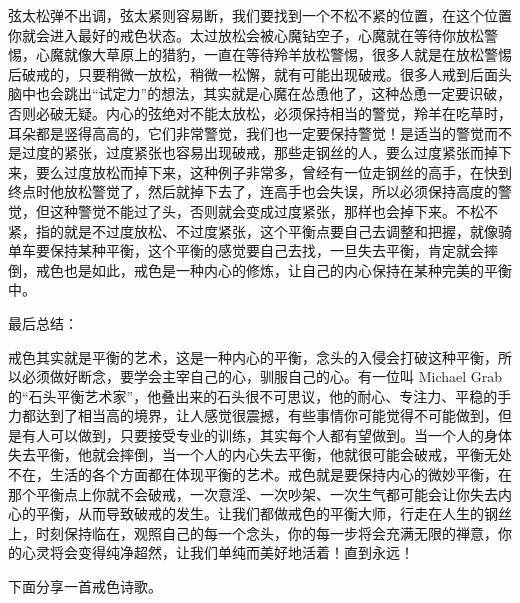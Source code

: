 弦太松弹不出调，弦太紧则容易断，我们要找到一个不松不紧的位置，在这个位置你就会进入最好的戒色状态。太过放松会被心魔钻空子，心魔就在等待你放松警惕，心魔就像大草原上的猎豹，一直在等待羚羊放松警惕，很多人就是在放松警惕后破戒的，只要稍微一放松，稍微一松懈，就有可能出现破戒。很多人戒到后面头脑中也会跳出“试定力”的想法，其实就是心魔在怂恿他了，这种怂恿一定要识破，否则必破无疑。内心的弦绝对不能太放松，必须保持相当的警觉，羚羊在吃草时，耳朵都是竖得高高的，它们非常警觉，我们也一定要保持警觉！是适当的警觉而不是过度的紧张，过度紧张也容易出现破戒，那些走钢丝的人，要么过度紧张而掉下来，要么过度放松而掉下来，这种例子非常多，曾经有一位走钢丝的高手，在快到终点时他放松警觉了，然后就掉下去了，连高手也会失误，所以必须保持高度的警觉，但这种警觉不能过了头，否则就会变成过度紧张，那样也会掉下来。不松不紧，指的就是不过度放松、不过度紧张，这个平衡点要自己去调整和把握，就像骑单车要保持某种平衡，这个平衡的感觉要自己去找，一旦失去平衡，肯定就会摔倒，戒色也是如此，戒色是一种内心的修炼，让自己的内心保持在某种完美的平衡中。

最后总结：

戒色其实就是平衡的艺术，这是一种内心的平衡，念头的入侵会打破这种平衡，所以必须做好断念，要学会主宰自己的心，驯服自己的心。有一位叫 Michael Grab 的“石头平衡艺术家”，他叠出来的石头很不可思议，他的耐心、专注力、平稳的手力都达到了相当高的境界，让人感觉很震撼，有些事情你可能觉得不可能做到，但是有人可以做到，只要接受专业的训练，其实每个人都有望做到。当一个人的身体失去平衡，他就会摔倒，当一个人的内心失去平衡，他就很可能会破戒，平衡无处不在，生活的各个方面都在体现平衡的艺术。戒色就是要保持内心的微妙平衡，在那个平衡点上你就不会破戒，一次意淫、一次吵架、一次生气都可能会让你失去内心的平衡，从而导致破戒的发生。让我们都做戒色的平衡大师，行走在人生的钢丝上，时刻保持临在，观照自己的每一个念头，你的每一步将会充满无限的禅意，你的心灵将会变得纯净超然，让我们单纯而美好地活着！直到永远！

下面分享一首戒色诗歌。

